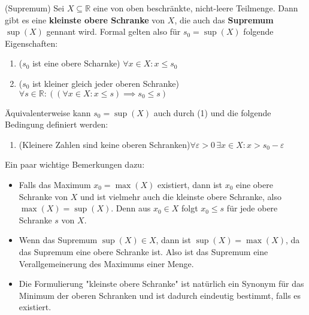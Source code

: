 \documentclass[../Analysis1_script.tex]{subfiles}
\begin{document}
\begin{proposition}{(Supremum)}\label{prop:supremum}
	Sei $X \subseteq \mathbb{R}$ eine von oben beschränkte, nicht-leere Teilmenge. Dann gibt es eine \textbf{kleinste obere Schranke} von $X$, die auch das \textbf{Supremum} $\sup (X)$ gennant wird. Formal gelten also für $s_0 = \sup(X)$ folgende Eigenschaften:
	\begin{enumerate}
		\item{($s_0$ ist eine obere Scharnke)} $\forall x \in X : x \leq s_0$
		\item{($s_0$ ist kleiner gleich jeder oberen Schranke)} $\forall s \in \mathbb{R}: ((\forall x \in X: x \leq s) \implies s_0 \leq s)$
	\end{enumerate} 
	Äquivalenterweise kann $s_0 = \sup(X)$ auch durch (1) und die folgende Bedingung definiert werden:
	\begin{enumerate}[resume]
		\item{(Kleinere Zahlen sind keine oberen Schranken)}$\forall \varepsilon > 0 \,\exists x \in X : x > s_0 - \varepsilon$
	\end{enumerate}
	
	Ein paar wichtige Bemerkungen dazu:
	\begin{itemize}
		\item Falls das Maximum $x_0 = \max(X)$ existiert, dann ist $x_0$ eine obere Schranke von $X$ und ist vielmehr auch die kleinste obere Schranke, also $\max(X) = \sup(X)$. Denn aus $x_0 \in X$ folgt $x_0 \leq s$ für jede obere Schranke $s$ von $X$.
		\item Wenn das Supremum $\sup(X) \in X$, dann ist $\sup(X) = \max(X)$, da das Supremum eine obere Schranke ist. Also ist das Supremum eine  Verallgemeinerung des Maximums einer Menge.
		\item Die Formulierung "kleinste obere Schranke" ist natürlich ein Synonym für das Minimum der oberen Schranken und ist dadurch eindeutig bestimmt, falls es existiert.
	\end{itemize}
\end{proposition}
\end{document}

